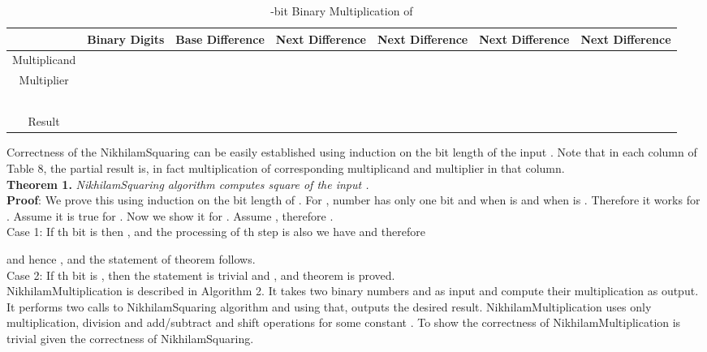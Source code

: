 \documentclass[conference]{IEEEtran}
\begin{document}
\begin{table*}[ht]
\renewcommand{\arraystretch}{1.3}
\caption{-bit Binary Multiplication of }
\label{table 8}
\begin{center}
\begin{tabular}{|c| c| c| c| c| c| c|} 
\hline
 & Binary Digits & Base Difference  & Next Difference & Next Difference & Next Difference & Next Difference \\ [1ex] \hline\hline 
Multiplicand &  &  &  &  &  &  \\ \hline
Multiplier &  &  &  &  &  &   \\ \hline
 &  &  &  &  &  &   \\ \hline
 &  &  &  &  &  & \\ \hline
 &  &  &  & &  & \\ \hline
 &  &  & &  &  & \\ \hline
 &  &   &  &  &  & \\ \hline
Result &  &  &  &  &  & \\ [1ex] \hline

\end{tabular} 
\end{center}
\end{table*} 

Correctness of the NikhilamSquaring can be easily established using induction on the bit length of the input . Note that in each column of Table 8, the partial result is, in fact multiplication of corresponding multiplicand and multiplier in that column.\\
 
 
\textbf{Theorem 1.} \textit{NikhilamSquaring algorithm computes square of the input .}\\
 
\textbf{Proof}:  We prove this using induction on the bit length  of . For , number  has only one bit and  when  is  and  when  is . Therefore it works for . Assume it is true for . Now we show it for . Assume , therefore . \\
 Case 1: If th bit is  then , and the processing of th step is  also we have  and therefore
   
 and hence , and the statement of theorem follows.\\
 Case 2: If th bit is , then the statement is trivial and , and theorem is proved.\\


\indent NikhilamMultiplication is described in Algorithm 2. It takes two binary numbers  and  as input and compute their multiplication as output. It performs two calls to NikhilamSquaring algorithm and using that, outputs the desired result. NikhilamMultiplication uses only  multiplication,  division and  add/subtract and shift operations for some constant . To show the correctness of NikhilamMultiplication is trivial given the correctness of NikhilamSquaring.\\
\end{document}
